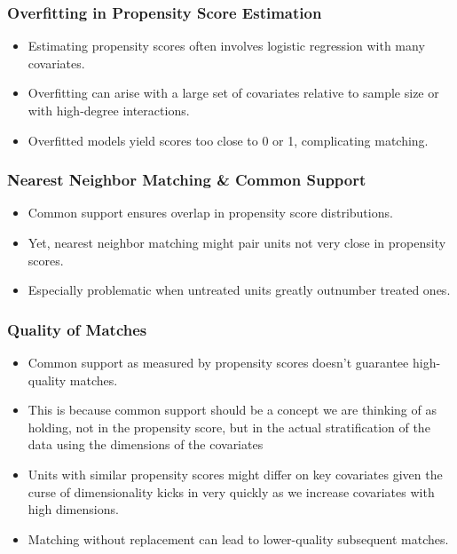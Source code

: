 \documentclass{beamer}
\begin{document}
\begin{frame}
\frametitle{Overfitting in Propensity Score Estimation}
\begin{itemize}
    \item Estimating propensity scores often involves logistic regression with many covariates.
    \item Overfitting can arise with a large set of covariates relative to sample size or with high-degree interactions.
    \item Overfitted models yield scores too close to 0 or 1, complicating matching.
\end{itemize}
\end{frame}

\begin{frame}
\frametitle{Nearest Neighbor Matching \& Common Support}
\begin{itemize}
    \item Common support ensures overlap in propensity score distributions.
    \item Yet, nearest neighbor matching might pair units not very close in propensity scores.
    \item Especially problematic when untreated units greatly outnumber treated ones.
\end{itemize}
\end{frame}

\begin{frame}
\frametitle{Quality of Matches}
\begin{itemize}
    \item Common support as measured by propensity scores doesn't guarantee high-quality matches.
    \item This is because common support should be a concept we are thinking of as holding, not in the propensity score, but in the actual stratification of the data using the dimensions of the covariates
    \item Units with similar propensity scores might differ on key covariates given the curse of dimensionality kicks in very quickly as we increase covariates with high dimensions.
    \item Matching without replacement can lead to lower-quality subsequent matches.
\end{itemize}
\end{frame}
\end{document}
